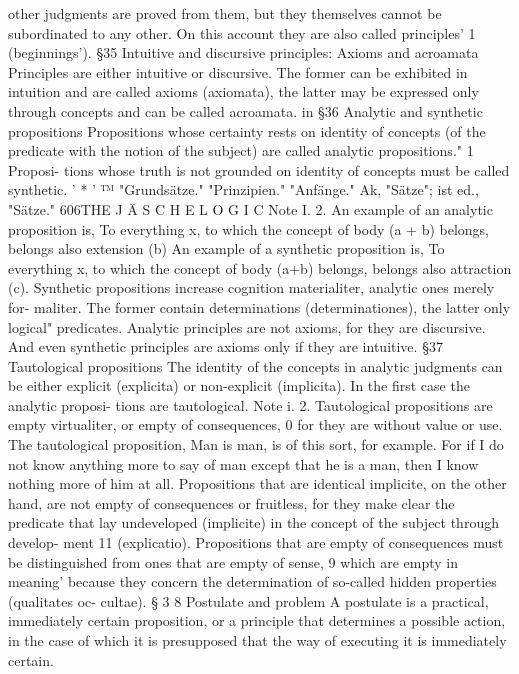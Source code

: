 other judgments are proved from them, but they themselves cannot be
subordinated to any other. On this account they are also called principles' 1
(beginnings').
§35
Intuitive and discursive principles: Axioms and acroamata
Principles are either intuitive or discursive. The former can be exhibited in
intuition and are called axioms (axiomata), the latter may be expressed only
through concepts and can be called acroamata.
in
§36
Analytic and synthetic propositions
Propositions whose certainty rests on identity of concepts (of the predicate
with the notion of the subject) are called analytic propositions." 1 Proposi-
tions whose truth is not grounded on identity of concepts must be called
synthetic.
'
*
'
™
"Grundsätze."
"Prinzipien."
"Anfänge."
Ak, "Sätze"; ist ed., "Sätze."
606THE J Ä S C H E L O G I C
Note I.
2.
An example of an analytic proposition is, To everything x, to which the
concept of body (a + b) belongs, belongs also extension (b)
An example of a synthetic proposition is, To everything x, to which the
concept of body (a+b) belongs, belongs also attraction (c). Synthetic
propositions increase cognition materialiter, analytic ones merely for-
maliter. The former contain determinations (determinationes), the latter
only logical" predicates.
Analytic principles are not axioms, for they are discursive. And even
synthetic principles are axioms only if they are intuitive.
§37
Tautological propositions
The identity of the concepts in analytic judgments can be either explicit
(explicita) or non-explicit (implicita). In the first case the analytic proposi-
tions are tautological.
Note i.
2.
Tautological propositions are empty virtualiter, or empty of consequences, 0
for they are without value or use. The tautological proposition, Man is
man, is of this sort, for example. For if I do not know anything more to say
of man except that he is a man, then I know nothing more of him at all.
Propositions that are identical implicite, on the other hand, are not
empty of consequences or fruitless, for they make clear the predicate that
lay undeveloped (implicite) in the concept of the subject through develop-
ment 11 (explicatio).
Propositions that are empty of consequences must be distinguished from
ones that are empty of sense, 9 which are empty in meaning' because they
concern the determination of so-called hidden properties (qualitates oc-
cultae).
§ 3 8
Postulate and problem
A postulate is a practical, immediately certain proposition, or a principle
that determines a possible action, in the case of which it is presupposed
that the way of executing it is immediately certain.
